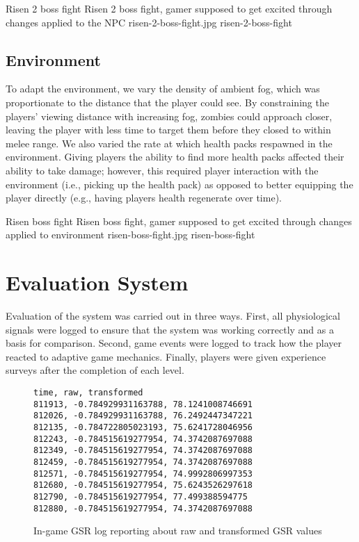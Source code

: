 \largeimg
{Risen 2 boss fight}
{Risen 2 boss fight, gamer supposed to get excited through changes applied to the NPC}
{risen-2-boss-fight.jpg}
{risen-2-boss-fight}

\subsection{Environment}
To adapt the environment, we vary the density of ambient fog, which was proportionate to the distance that the player could see. By constraining the players' viewing distance with increasing fog, zombies could approach closer, leaving the player with less time to target them before they closed to within melee range. We also varied the rate at which health packs respawned in the environment. Giving players the ability to find more health packs affected their ability to take damage; however, this required player interaction with the environment (i.e., picking up the health pack) as opposed to better equipping the player directly (e.g., having players health regenerate over time).

\largeimg
{Risen boss fight}
{Risen boss fight, gamer supposed to get excited through changes applied to environment}
{risen-boss-fight.jpg}
{risen-boss-fight}

\section{Evaluation System}
Evaluation of the system was carried out in three ways. First, all physiological signals were logged to ensure that the system was working correctly and as a basis for comparison. Second, game events were logged to track how the player reacted to adaptive game mechanics. Finally, players were given experience surveys after the completion of each level.

\begin{figure}
  \centering
\begin{lstlisting}[frame=none]
time, raw, transformed
811913, -0.784929931163788, 78.1241008746691
812026, -0.784929931163788, 76.2492447347221
812135, -0.784722805023193, 75.6241728046956
812243, -0.784515619277954, 74.3742087697088
812349, -0.784515619277954, 74.3742087697088
812459, -0.784515619277954, 74.3742087697088
812571, -0.784515619277954, 74.9992806997353
812680, -0.784515619277954, 75.6243526297618
812790, -0.784515619277954, 77.499388594775
812880, -0.784515619277954, 74.3742087697088
\end{lstlisting}
  \caption{In-game GSR log reporting about raw and transformed GSR values}
  \label{txt:log-gsr}
\end{figure}

